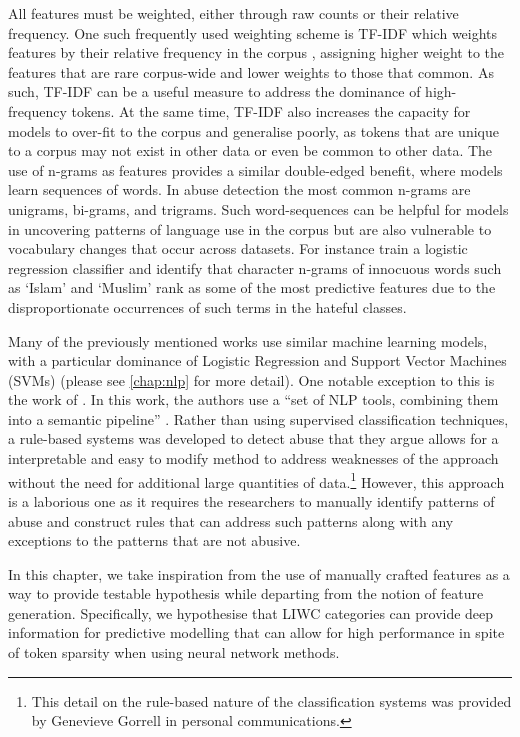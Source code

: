 All features must be weighted, either through raw counts or their relative frequency. One such frequently used weighting scheme is TF-IDF which weights features by their relative frequency in the corpus \citep{Fortuna:2018}, assigning higher weight to the features that are rare corpus-wide and lower weights to those that common. As such, TF-IDF can be a useful measure to address the dominance of high-frequency tokens. At the same time, TF-IDF also increases the capacity for models to over-fit to the corpus and generalise poorly, as tokens that are unique to a corpus may not exist in other data or even be common to other data. The use of n-grams as features provides a similar double-edged benefit, where models learn sequences of words. In abuse detection the most common n-grams are unigrams, bi-grams, and trigrams. Such word-sequences can be helpful for models in uncovering patterns of language use in the corpus but are also vulnerable to vocabulary changes that occur across datasets. For instance \citet{Waseem-Hovy:2016} train a logistic regression classifier and identify that character n-grams of innocuous words such as `Islam' and `Muslim' rank as some of the most predictive features due to the disproportionate occurrences of such terms in the hateful classes.

Many of the previously mentioned works use similar machine learning models, with a particular dominance of Logistic Regression and Support Vector Machines (SVMs) (please see \cref{chap:nlp} for more detail). One notable exception to this is the work of \citet{Gorrell:2018}. In this work, the authors use a ``set of NLP tools, combining them into a semantic pipeline'' \citep[pp. 601]{Gorrell:2018}. Rather than using supervised classification techniques, a rule-based systems was developed to detect abuse that they argue allows for a interpretable and easy to modify method to address weaknesses of the approach without the need for additional large quantities of data.\footnote{This detail on the rule-based nature of the classification systems was provided by Genevieve Gorrell in personal communications.} However, this approach is a laborious one as it requires the researchers to manually identify patterns of abuse and construct rules that can address such patterns along with any exceptions to the patterns that are not abusive.
\vspace{5mm}

In this chapter, we take inspiration from the use of manually crafted features as a way to provide testable hypothesis while departing from the notion of feature generation. Specifically, we hypothesise that LIWC categories can provide deep information for predictive modelling that can allow for high performance in spite of token sparsity when using neural network methods.

